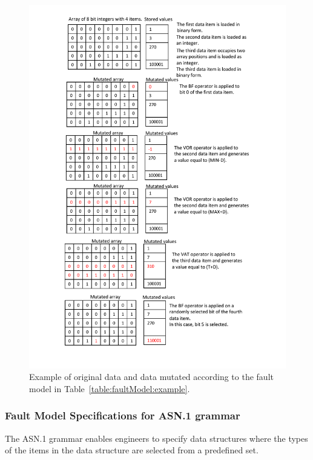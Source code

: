 

\begin{figure}[h]
  \centering
    \includegraphics[width=12cm]{images/dataMutationFMExample.pdf}
      \caption{Example of original data and  data mutated according to the fault model in Table~\ref{table:faultModel:example}.}
      \label{fig:dataMutationFMExamples}
\end{figure}

\clearpage
\subsubsection{Fault Model Specifications for ASN.1 grammar}
\label{subsub:asn1model}

The ASN.1 grammar enables engineers to specify data structures where the types of the items in the data structure are selected from a predefined set.


